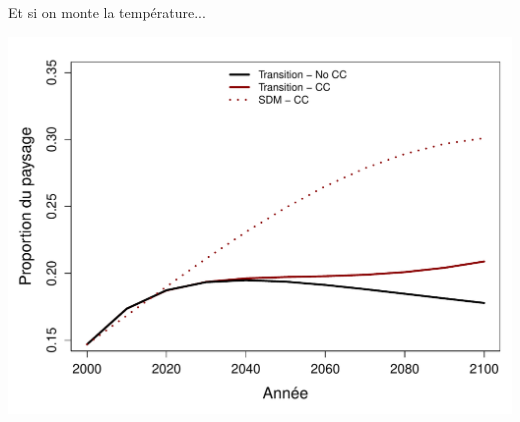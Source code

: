 \documentclass{eecslides}
\begin{document}
%
%



	\begin{frame}{Et si on monte la température...}
		\begin{center}
			\includegraphics[height=0.6\textheight]{CC_MF}
		\end{center}
	\end{frame}

\end{document}
